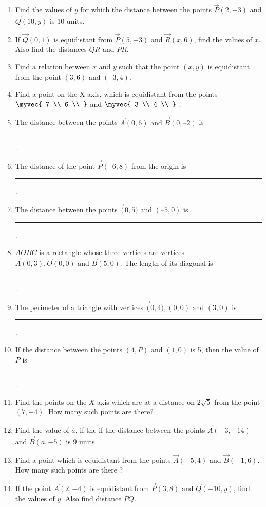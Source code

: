 \begin{enumerate}[label=\thesubsection.\arabic*, ref=\thesubsection.\theenumi]
\item Find the values of $y$ for which the distance between the points                  $\vec{P}(2, -3)$ and $\vec{Q}(10, y)$ is 10 units.
\item  If $\vec{Q}(0,  1)$ is equidistant from $\vec{P}(5,  -3)$ and $\vec{R}(x,  6)$,  find the values of $x$. Also find the
distances $QR$ and $PR$.
\item  Find a relation between $x$ and $y$ such that the point $(x, y)$ is equidistant from the point
$(3,  6)$ and $(– 3,  4)$.
	\item Find a point on the X axis, which is equidistant from the points $\myvec{
  7 \\
  6 \\
 }$ and $\myvec{
  3 \\
  4 \\
 }$
.
\label{chapters/11/10/1/4}
%
\item The distance between the points $\vec{A}(0,  6) \text{ and } \vec{B}(0,  –2)$ is \rule{1cm}{0.1pt}.
\item The distance of the point $\vec{P} (–6,  8)$ from the origin is \rule{1cm}{0.1pt}.
\item The distance between the points $\vec(0,  5)\text{ and }(–5,  0)$ is \rule{1cm}{0.1pt}.
\item $AOBC$ is a rectangle whose three vertices are vertices $\vec{A} (0,  3),  \vec{O}(0,  0)\text{ and }
	\vec{B} (5,  0)$. The length of its diagonal is \rule{1cm}{0.1pt}.
\item The perimeter of a triangle with vertices $\vec(0,  4),  (0,  0) \text{ and } (3,  0)$ is \rule{1cm}{0.1pt}.
\item If the distance between the points $(4, P)$  and $ (1, 0)$ is 5, then the value of $P$ is \rule{1cm}{0.1pt}.
\item Find the points on the $X$ axis which are at a distance on $2\sqrt{5}$ from the point $ (7, -4).$ How many such points are there?
\item Find the value of $a$,  if the if the distance between the points $\vec{A}(-3, -14)$  and $\vec{B}(a, -5)$ is 9 units.
\item Find a point which is equidistant from the points $\vec{A}(-5, 4)$  and $\vec{B}(-1, 6)$.  How many such points are there ?
\item If the point $\vec{A}(2, -4)$ is equidistant from $\vec{P}(3, 8)$  and $\vec{Q}(-10, y)$,  find the values of $y$.  Also find distance $PQ$.

\end{enumerate}
